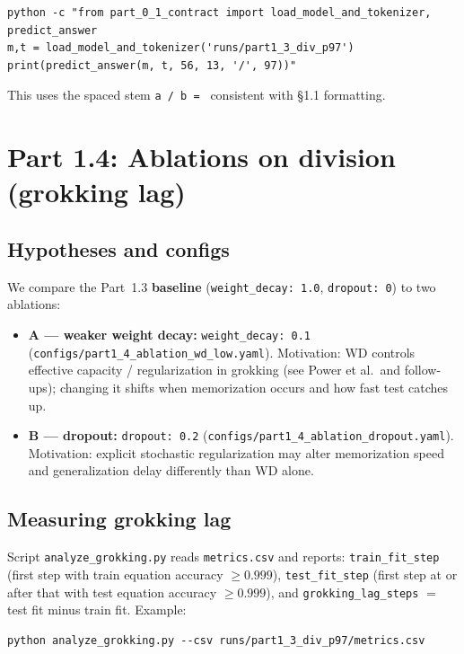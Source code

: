 \documentclass[11pt]{article}
\begin{document}
\begin{verbatim}
python -c "from part_0_1_contract import load_model_and_tokenizer, predict_answer
m,t = load_model_and_tokenizer('runs/part1_3_div_p97')
print(predict_answer(m, t, 56, 13, '/', 97))"
\end{verbatim}

\noindent
This uses the spaced stem \texttt{a / b = } consistent with \S1.1 formatting.

\section*{Part 1.4: Ablations on division (grokking lag)}

\subsection*{Hypotheses and configs}

We compare the Part~1.3 \textbf{baseline} (\texttt{weight\_decay:\ 1.0}, \texttt{dropout:\ 0}) to two ablations:

\begin{itemize}
  \item \textbf{A --- weaker weight decay:} \texttt{weight\_decay:\ 0.1} (\texttt{configs/part1\_4\_ablation\_wd\_low.yaml}). Motivation: WD controls effective capacity / regularization in grokking (see Power et al.\ and follow-ups); changing it shifts when memorization occurs and how fast test catches up.
  \item \textbf{B --- dropout:} \texttt{dropout:\ 0.2} (\texttt{configs/part1\_4\_ablation\_dropout.yaml}). Motivation: explicit stochastic regularization may alter memorization speed and generalization delay differently than WD alone.
\end{itemize}

\subsection*{Measuring grokking lag}

Script \texttt{analyze\_grokking.py} reads \texttt{metrics.csv} and reports:
\texttt{train\_fit\_step} (first step with train equation accuracy $\geq 0.999$),
\texttt{test\_fit\_step} (first step at or after that with test equation accuracy $\geq 0.999$),
and \texttt{grokking\_lag\_steps} $=$ test fit minus train fit.
Example:

\begin{verbatim}
python analyze_grokking.py --csv runs/part1_3_div_p97/metrics.csv
\end{verbatim}
\end{document}
